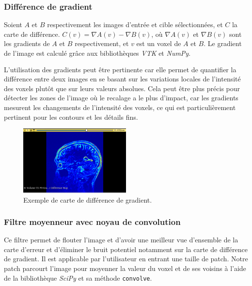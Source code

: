 \documentclass{article}
\begin{document}
{{        \subsubsection{Différence de gradient}
        \label{subsubsec:gradient-difference-difference-map-computation-implementation}

        Soient $A$ et $B$ respectivement les images d'entrée et cible sélectionnées, et $C$ la carte de différence. $C(v) = \nabla A(v) - \nabla B(v)$, où $\nabla A(v)$ et $\nabla B(v)$ sont les gradients de $A$ et $B$ respectivement, et $v$ est un voxel de $A$ et $B$. Le gradient de l'image est calculé grâce aux bibliothèques \textit{VTK} et \textit{NumPy}.

        \bigskip

        L'utilisation des gradients peut être pertinente car elle permet de quantifier la différence entre deux images en se basant sur les variations locales de l'intensité des voxels plutôt que sur leurs valeurs absolues. Cela peut être plus précis pour détecter les zones de l'image où le recalage a le plus d'impact, car les gradients mesurent les changements de l'intensité des voxels, ce qui est particulièrement pertinent pour les contours et les détails fins.

        \begin{figure}[!ht]
            \centering
            \includegraphics[width=0.5\textwidth]{images/gradient.png}
            \caption{Exemple de carte de différence de gradient.}
            \label{fig:gradient}
        \end{figure}

        \subsubsection{Filtre moyenneur avec noyau de convolution}
        \label{subsubsec:convolution-kernel-difference-map-computation-implementation}

        Ce filtre permet de flouter l'image et d'avoir une meilleur vue d'ensemble de la carte d'erreur et d'éliminer le bruit potentiel notamment sur la carte de différence de gradient. Il est applicable par l'utilisateur en entrant une taille de patch. Notre patch parcourt l'image pour moyenner la valeur du voxel et de ses voisins à l'aide de la bibliothèque \textit{SciPy} et sa méthode \texttt{convolve}.

}}
\end{document}
